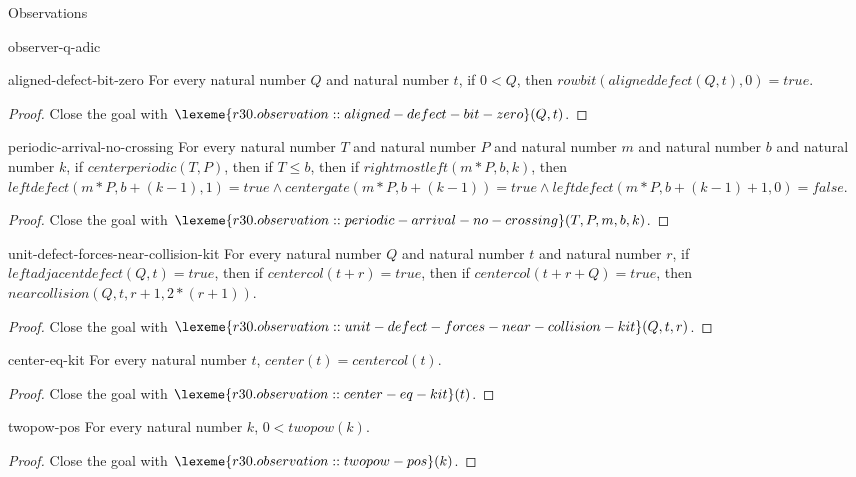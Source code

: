\begin{lexlean}{Observations}
\begin{section}{observer-q-adic}
\begin{theorem}{aligned-defect-bit-zero}
For every natural number \(Q\) and natural number \(t\), if \(0 < Q\), then \(rowbit(aligneddefect(Q, t), 0) = true\).
\begin{proof}
Close the goal with \(\lexeme{r30.observation::aligned-defect-bit-zero}(Q, t)\).
\end{proof}
\end{theorem}

\begin{theorem}{periodic-arrival-no-crossing}
For every natural number \(T\) and natural number \(P\) and natural number \(m\) and natural number \(b\) and natural number \(k\), if \(centerperiodic(T, P)\), then if \(T ≤ b\), then if \(rightmostleft(m * P, b, k)\), then \(leftdefect(m * P, b + (k - 1), 1) = true ∧ centergate(m * P, b + (k - 1)) = true ∧ leftdefect(m * P, b + (k - 1) + 1, 0) = false\).
\begin{proof}
Close the goal with \(\lexeme{r30.observation::periodic-arrival-no-crossing}(T, P, m, b, k)\).
\end{proof}
\end{theorem}

\begin{theorem}{unit-defect-forces-near-collision-kit}
For every natural number \(Q\) and natural number \(t\) and natural number \(r\), if \(leftadjacentdefect(Q, t) = true\), then if \(centercol(t + r) = true\), then if \(centercol(t + r + Q) = true\), then \(nearcollision(Q, t, r + 1, 2 * (r + 1))\).
\begin{proof}
Close the goal with \(\lexeme{r30.observation::unit-defect-forces-near-collision-kit}(Q, t, r)\).
\end{proof}
\end{theorem}

\begin{theorem}{center-eq-kit}
For every natural number \(t\), \(center(t) = centercol(t)\).
\begin{proof}
Close the goal with \(\lexeme{r30.observation::center-eq-kit}(t)\).
\end{proof}
\end{theorem}

\begin{theorem}{twopow-pos}
For every natural number \(k\), \(0 < twopow(k)\).
\begin{proof}
Close the goal with \(\lexeme{r30.observation::twopow-pos}(k)\).
\end{proof}
\end{theorem}


\end{section}
\end{lexlean}
